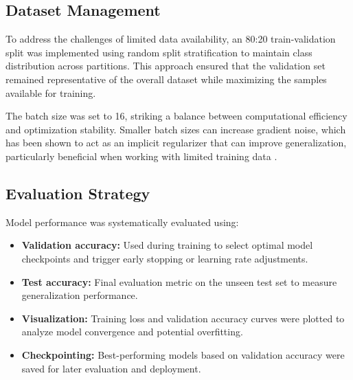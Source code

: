 \documentclass[a4paper,12pt]{report}
\begin{document}
\subsection{Dataset Management}

To address the challenges of limited data availability, an 80:20 train-validation split was implemented using random split stratification to maintain class distribution across partitions. This approach ensured that the validation set remained representative of the overall dataset while maximizing the samples available for training. %


The batch size was set to 16, striking a balance between computational efficiency and optimization stability. Smaller batch sizes can increase gradient noise, which has been shown to act as an implicit regularizer that can improve generalization, particularly beneficial when working with limited training data \citep{keskar2016largebatch, masters2018revisiting}.


\subsection{Evaluation Strategy}

Model performance was systematically evaluated using:

\begin{itemize}
    \item \textbf{Validation accuracy:} Used during training to select optimal model checkpoints and trigger early stopping or learning rate adjustments.
    \item \textbf{Test accuracy:} Final evaluation metric on the unseen test set to measure generalization performance.
    \item \textbf{Visualization:} Training loss and validation accuracy curves were plotted to analyze model convergence and potential overfitting.
    \item \textbf{Checkpointing:} Best-performing models based on validation accuracy were saved for later evaluation and deployment.
\end{itemize}
\end{document}
